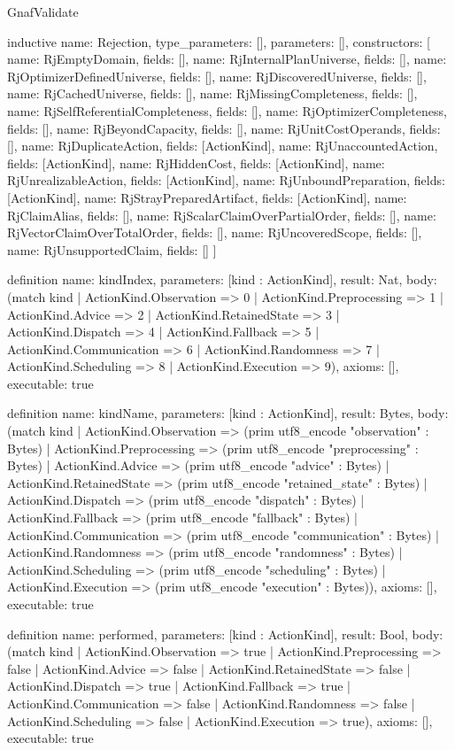 \begin{lexlean}{GnafValidate}
\begin{semanticmodule}
inductive{
  name: Rejection,
  type_parameters: [],
  parameters: [],
  constructors: [
    {name: RjEmptyDomain, fields: []},
    {name: RjInternalPlanUniverse, fields: []},
    {name: RjOptimizerDefinedUniverse, fields: []},
    {name: RjDiscoveredUniverse, fields: []},
    {name: RjCachedUniverse, fields: []},
    {name: RjMissingCompleteness, fields: []},
    {name: RjSelfReferentialCompleteness, fields: []},
    {name: RjOptimizerCompleteness, fields: []},
    {name: RjBeyondCapacity, fields: []},
    {name: RjUnitCostOperands, fields: []},
    {name: RjDuplicateAction, fields: [ActionKind]},
    {name: RjUnaccountedAction, fields: [ActionKind]},
    {name: RjHiddenCost, fields: [ActionKind]},
    {name: RjUnrealizableAction, fields: [ActionKind]},
    {name: RjUnboundPreparation, fields: [ActionKind]},
    {name: RjStrayPreparedArtifact, fields: [ActionKind]},
    {name: RjClaimAlias, fields: []},
    {name: RjScalarClaimOverPartialOrder, fields: []},
    {name: RjVectorClaimOverTotalOrder, fields: []},
    {name: RjUncoveredScope, fields: []},
    {name: RjUnsupportedClaim, fields: []}
  ]
}

definition{
  name: kindIndex,
  parameters: [kind : ActionKind],
  result: Nat,
  body: (match kind
    | ActionKind.Observation => 0
    | ActionKind.Preprocessing => 1
    | ActionKind.Advice => 2
    | ActionKind.RetainedState => 3
    | ActionKind.Dispatch => 4
    | ActionKind.Fallback => 5
    | ActionKind.Communication => 6
    | ActionKind.Randomness => 7
    | ActionKind.Scheduling => 8
    | ActionKind.Execution => 9),
  axioms: [],
  executable: true
}

definition{
  name: kindName,
  parameters: [kind : ActionKind],
  result: Bytes,
  body: (match kind
    | ActionKind.Observation => (prim utf8_encode "observation" : Bytes)
    | ActionKind.Preprocessing => (prim utf8_encode "preprocessing" : Bytes)
    | ActionKind.Advice => (prim utf8_encode "advice" : Bytes)
    | ActionKind.RetainedState => (prim utf8_encode "retained_state" : Bytes)
    | ActionKind.Dispatch => (prim utf8_encode "dispatch" : Bytes)
    | ActionKind.Fallback => (prim utf8_encode "fallback" : Bytes)
    | ActionKind.Communication => (prim utf8_encode "communication" : Bytes)
    | ActionKind.Randomness => (prim utf8_encode "randomness" : Bytes)
    | ActionKind.Scheduling => (prim utf8_encode "scheduling" : Bytes)
    | ActionKind.Execution => (prim utf8_encode "execution" : Bytes)),
  axioms: [],
  executable: true
}

definition{
  name: performed,
  parameters: [kind : ActionKind],
  result: Bool,
  body: (match kind
    | ActionKind.Observation => true
    | ActionKind.Preprocessing => false
    | ActionKind.Advice => false
    | ActionKind.RetainedState => false
    | ActionKind.Dispatch => true
    | ActionKind.Fallback => true
    | ActionKind.Communication => false
    | ActionKind.Randomness => false
    | ActionKind.Scheduling => false
    | ActionKind.Execution => true),
  axioms: [],
  executable: true
}


\end{semanticmodule}
\end{lexlean}
